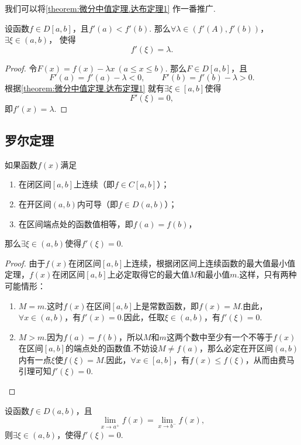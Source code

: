 我们可以将\cref{theorem:微分中值定理.达布定理1} 作一番推广.
\begin{theorem}[达布介值定理]\label{theorem:微分中值定理.达布定理2}
设函数\(f \in D[a,b]\)，且\(f'(a) < f'(b)\).
那么\(\forall\lambda\in(f'(A),f'(b))\)，\(\exists\xi\in(a,b)\)，%
使得\[
f'(\xi) = \lambda.
\]
\begin{proof}
令\(F(x) = f(x) - \lambda x\ (a \leq x \leq b)\).
那么\(F \in D[a,b]\)，且\[
F'(a) = f'(a) - \lambda < 0, \qquad
F'(b) = f'(b) - \lambda > 0.
\]
根据\cref{theorem:微分中值定理.达布定理1} 就有\(\exists\xi\in[a,b]\)使得\[
F'(\xi)=0,
\]即\(f'(x) = \lambda\).
\end{proof}
\end{theorem}

\subsection{罗尔定理}
\begin{theorem}[罗尔定理]\label{theorem:微分中值定理.罗尔定理}
如果函数\(f(x)\)满足
\begin{enumerate}
\item 在闭区间\([a,b]\)上连续（即\(f \in C[a,b]\)）；
\item 在开区间\((a,b)\)内可导（即\(f \in D(a,b)\)）；
\item 在区间端点处的函数值相等，即\(f(a)=f(b)\)，%
\end{enumerate}
那么\(\exists \xi \in (a,b)\)使得\(f'(\xi) = 0\).
\begin{proof}
由于\(f(x)\)在闭区间\([a,b]\)上连续，根据闭区间上连续函数的最大值最小值定理，\(f(x)\)在闭区间\([a,b]\)上必定取得它的最大值\(M\)和最小值\(m\).这样，只有两种可能情形：\begin{enumerate}
\item \(M=m\).这时\(f(x)\)在区间\([a,b]\)上是常数函数，即\(f(x)=M\).由此，\(\forall x\in(a,b)\)，有\(f'(x)=0\).因此，任取\(\xi\in(a,b)\)，有\(f'(\xi)=0\).
\item \(M>m\).因为\(f(a)=f(b)\)，所以\(M\)和\(m\)这两个数中至少有一个不等于\(f(x)\)在区间\([a,b]\)的端点处的函数值.不妨设\(M \neq f(a)\)，那么必定在开区间\((a,b)\)内有一点\(\xi\)使\(f(\xi)=M\).因此，\(\forall x\in[a,b]\)，有\(f(x) \leq f(\xi)\)，从而由费马引理可知\(f'(\xi)=0\).
\qedhere
\end{enumerate}
\end{proof}
\end{theorem}

\begin{corollary}
设函数\(f \in D(a,b)\)，且\[
\lim\limits_{x \to a^+} f(x)
= \lim\limits_{x \to b^-} f(x),
\]则\(\exists\xi\in(a,b)\)，使得\(f'(\xi) = 0\).
\end{corollary}

